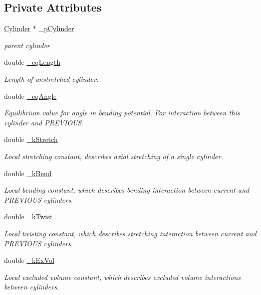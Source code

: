 \subsection*{Private Attributes}
\begin{DoxyCompactItemize}
\item 
\hyperlink{classCylinder}{Cylinder} $\ast$ \hyperlink{classMCylinder_ae7264ecc5bc382231f37821347db7f82}{\+\_\+p\+Cylinder}
\begin{DoxyCompactList}\small\item\em parent cylinder \end{DoxyCompactList}\item 
double \hyperlink{classMCylinder_aa368a3a46725ee7e2b16a9786dc88ffe}{\+\_\+eq\+Length}
\begin{DoxyCompactList}\small\item\em Length of unstretched cylinder. \end{DoxyCompactList}\item 
double \hyperlink{classMCylinder_aa542255d87485fa1e7bca2ef5b3b872f}{\+\_\+eq\+Angle}
\begin{DoxyCompactList}\small\item\em Equilibrium value for angle in bending potential. For interaction between this cylinder and P\+R\+E\+V\+I\+O\+U\+S. \end{DoxyCompactList}\item 
double \hyperlink{classMCylinder_af153db32e79db040668aeea45fcfe594}{\+\_\+k\+Stretch}
\begin{DoxyCompactList}\small\item\em Local stretching constant, describes axial stretching of a single cylinder. \end{DoxyCompactList}\item 
double \hyperlink{classMCylinder_a49de338cc5d2d74356cf8da395a5fe54}{\+\_\+k\+Bend}
\begin{DoxyCompactList}\small\item\em Local bending constant, which describes bending interaction between current and P\+R\+E\+V\+I\+O\+U\+S cylinders. \end{DoxyCompactList}\item 
double \hyperlink{classMCylinder_a411d5b040058afae90b54438f930cfc9}{\+\_\+k\+Twist}
\begin{DoxyCompactList}\small\item\em Local twisting constant, which describes stretching interaction between current and P\+R\+E\+V\+I\+O\+U\+S cylinders. \end{DoxyCompactList}\item 
double \hyperlink{classMCylinder_a7393cc9a56c96bf924be20248aca0b4a}{\+\_\+k\+Ex\+Vol}
\begin{DoxyCompactList}\small\item\em Local excluded volume constant, which describes excluded volume interactions between cylinders. \end{DoxyCompactList}\end{DoxyCompactItemize}


